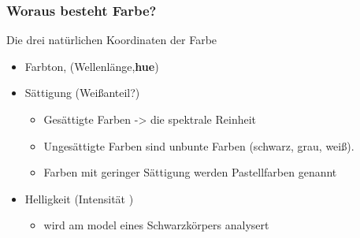 \documentclass{beamer}
\begin{document}
\begin{frame}[t]\frametitle{Woraus besteht Farbe?}
  Die drei natürlichen Koordinaten der Farbe
\begin{itemize}
      \item Farbton, (Wellenlänge,\textbf{hue}) %
   \item Sättigung (Weißanteil?) 
   \begin{itemize}
   \item Gesättigte Farben -> die spektrale Reinheit 
   \item Ungesättigte Farben sind unbunte Farben (schwarz, grau, weiß).
   \item Farben mit geringer Sättigung werden Pastellfarben genannt
   \end{itemize}


      \item Helligkeit (Intensität ) %
      \begin{itemize}
        \item  wird am model eines Schwarzkörpers analysert
      \end{itemize}
      
   \end{itemize}


 \end{frame}
\end{document}
